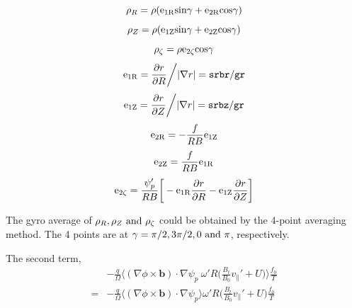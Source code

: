 \documentclass[12pt]{article}
\begin{document}
\begin{CJK*}{UTF8}{gbsn}
\begin{equation*}
    \rho_R = \rho({\rm e_{1R}sin}\gamma + {\rm e_{2R}cos}\gamma)
\end{equation*}
\begin{equation*}
    \rho_Z = \rho({\rm e_{1Z}sin}\gamma + {\rm e_{2Z}cos}\gamma)
\end{equation*}
\begin{equation*}
    \rho_\zeta = \rho{\rm e_{2\zeta}cos}\gamma
\end{equation*}
\begin{equation*}
    {\rm e_{1R}} = \frac{\partial r}{\partial R}\bigg/|\nabla r| = {\tt srbr/gr}
\end{equation*}
\begin{equation*}
    {\rm e_{1Z}} = \frac{\partial r}{\partial Z}\bigg/|\nabla r| = {\tt srbz/gr}
\end{equation*}
\begin{equation*}
    {\rm e_{2R}} = -\frac{f}{RB}{\rm e_{1Z}} 
\end{equation*}
\begin{equation*}
    {\rm e_{2Z}} = \frac{f}{RB}{\rm e_{1R}} 
\end{equation*}
\begin{equation*}
    {\rm e_{2\zeta}} = \frac{\psi_p'}{RB}\bigg[-{\rm e_{1R}}\frac{\partial r}{\partial R} - {\rm e_{1Z}}\frac{\partial r}{\partial Z}\bigg] 
\end{equation*}

The gyro average of $\rho_R, \rho_Z {\rm \ and\ } \rho_\zeta$ could be obtained by the 4-point averaging method.
The 4 points are at $\gamma=\pi/2,3\pi/2,0 {\rm \ and\ }\pi$, respectively.

The second term,
\begin{equation}
\begin{split}
    &-\frac{q}{\Omega}\bigg\langle(\nabla\phi\times\mathbf{b})\cdot\nabla\psi_p\ \omega'R\bigg(\frac{B_t}{B_0}v_\parallel'+U\bigg)\bigg\rangle\frac{f_0}{T}\\
    =&-\frac{q}{\Omega}\bigg\langle(\nabla\phi\times\mathbf{b})\cdot\nabla\psi_p\bigg\rangle\omega'R\bigg(\frac{B_t}{B_0}v_\parallel'+U\bigg)\frac{f_0}{T}\label{t2}
\end{split}
\end{equation}


\end{CJK*}
\end{document}
